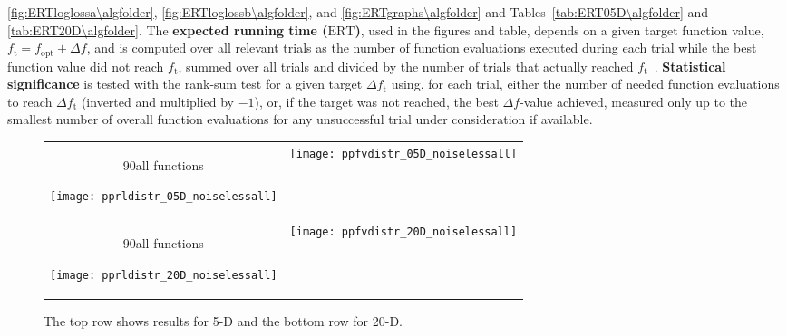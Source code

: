 \documentclass{article}
\newcommand{\ERT}{\ensuremath{\mathrm{ERT}}}
\newcommand{\Df}{\ensuremath{\Delta f}}
\newcommand{\fopt}{\ensuremath{f_\mathrm{opt}}}
\newcommand{\ftarget}{\ensuremath{f_\mathrm{t}}}
\newcommand{\rot}[2][2.5]{
  \hspace*{-3.5\baselineskip}%
  \begin{rotate}{90}\hspace{#1em}#2
  \end{rotate}}
\begin{document}
\ref{fig:ERTloglossa\algfolder}, \ref{fig:ERTloglossb\algfolder},
and \ref{fig:ERTgraphs\algfolder} and 
Tables~\ref{tab:ERT05D\algfolder} and \ref{tab:ERT20D\algfolder}.
The \textbf{expected running time (\ERT)}, used in the figures and table,
depends on a given target function value, $\ftarget=\fopt+\Df$, and is computed
over all relevant trials as the number of function evaluations executed during
each trial while the best function value did not reach \ftarget, summed over
all trials and divided by the number of trials that actually reached \ftarget\
\cite{hansen2010exp,price1997dev}.
\textbf{Statistical significance} is tested with the rank-sum test for a given
target $\Delta\ftarget$ using, for each trial, either the number of needed
function evaluations to reach $\Delta\ftarget$ (inverted and multiplied by
$-1$), or, if the target was not reached, the best $\Df$-value achieved,
measured only up to the smallest number of overall function evaluations for any
unsuccessful trial under consideration if available.
\begin{figure}[htbp!]
\centering
\begin{tabular}{@{}c@{}c@{}}
\rot[5]{all functions}\texttt{[image: pprldistr\_05D\_noiselessall]} &
\texttt{[image: ppfvdistr\_05D\_noiselessall]}\\
\rot[5]{all functions}\texttt{[image: pprldistr\_20D\_noiselessall]} &
\texttt{[image: ppfvdistr\_20D\_noiselessall]}
\end{tabular}
\caption{\label{fig:RLDs05Da\algfolder} \bbobpprldistrlegend{} The top row shows results for 5-D and the bottom row for 20-D.}
\end{figure}
\end{document}
